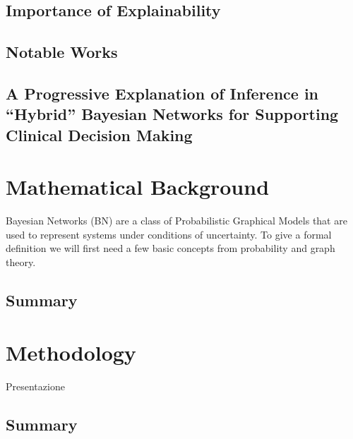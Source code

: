 \documentclass[mscthesis]{usiinfthesis}
\begin{document}
\section{Importance of Explainability}

\section{Notable Works}



\section{A Progressive Explanation of Inference in \enquote{Hybrid} Bayesian Networks for Supporting Clinical Decision Making}

\chapter{Mathematical Background}\label{chap:mathematical-background}
Bayesian Networks (BN) are a class of Probabilistic Graphical Models that are used to represent systems under conditions of uncertainty.
To give a formal definition we will first need a few basic concepts from probability and graph theory.




\section{Summary}


\chapter{Methodology}\label{chap:methodology}
Presentazione





\section{Summary}


\end{document}
